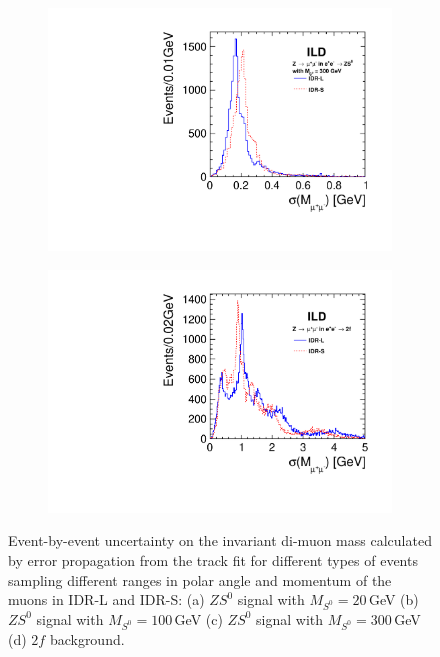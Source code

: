 \begin{figure}[htbp]
\begin{subfigure}{0.475\hsize}
\includegraphics[width=\textwidth]{Performance/fig/lepton_pair_inm_sigma_nh300.pdf}
 \caption{ \label{fig:extraH:Msigma:mh300}}
 \end{subfigure}
\begin{subfigure}{0.475\hsize} 
\includegraphics[width=\textwidth]{Performance/fig/lepton_pair_inm_sigma_2f.pdf}
 \caption{  \label{fig:extraH:Msigma:2f}}
 \end{subfigure}
\caption{Event-by-event uncertainty on the invariant di-muon mass calculated by error propagation from the track fit for different types of events sampling different ranges in polar angle and momentum of the muons in IDR-L and IDR-S:
(a) $ZS^0$ signal with $M_{S^0} = 20$\,GeV
(b) $ZS^0$ signal with $M_{S^0} = 100$\,GeV
(c) $ZS^0$ signal with $M_{S^0} = 300$\,GeV
(d) $2f$ background.
}
\label{fig:extraH:Msigma}
\end{figure}

